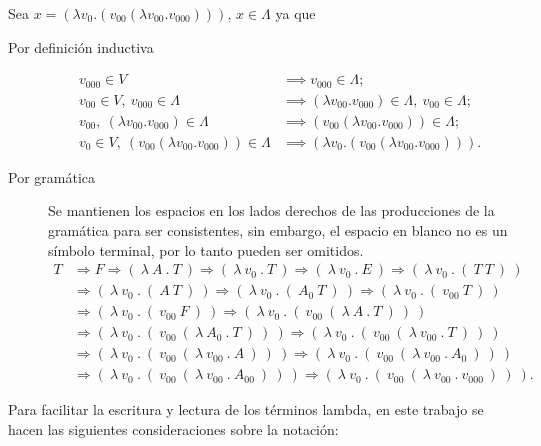 \begin{exmp} Sea \( x = (λv_{0}.(v_{00} (λv_{00}.v_{000}))) \), \( x \in Λ \) ya que

  \begin{description}
  \item[Por definición inductiva]
    \begin{align*}
      v_{000} \in V &\implies v_{000} \in Λ; \\
      v_{00} \in V,\ v_{000} \in Λ &\implies (λv_{00}.v_{000}) \in Λ,\ v_{00} \in Λ; \\
      v_{00},\ (λv_{00}.v_{000}) \in Λ &\implies (v_{00} (λv_{00}.v_{000})) \in Λ; \\
      v_{0} \in V,\ (v_{00} (λv_{00}.v_{000})) \in Λ &\implies (λv_{0}.(v_{00} (λv_{00}.v_{000}))).
    \end{align*}
  \item[Por gramática] Se mantienen los espacios en los lados derechos de las producciones de la gramática para ser consistentes, sin embargo, el espacio en blanco no es un símbolo terminal, por lo tanto pueden ser omitidos.
    \begin{align*}
      T &\Rightarrow F \Rightarrow (\ λ\ A\ .\ T\ ) \Rightarrow (\ λ\ v_{0}\ .\ T\ ) \Rightarrow (\ λ\ v_{0}\ .\ E\ ) \Rightarrow (\ λ\ v_{0}\ .\ (\ T\ T\ )\ ) \\
        &\Rightarrow (\ λ\ v_{0}\ .\ (\ A\ T\ )\ ) \Rightarrow (\ λ\ v_{0}\ .\ (\ A_{0}\ T\ )\ ) \Rightarrow (\ λ\ v_{0}\ .\ (\ v_{00}\ T\ )\ ) \\
        &\Rightarrow (\ λ\ v_{0}\ .\ (\ v_{00}\ F\ )\ ) \Rightarrow (\ λ\ v_{0}\ .\ (\ v_{00}\ (\ λ\ A\ .\ T\ )\ )\ ) \\
        &\Rightarrow (\ λ\ v_{0}\ .\ (\ v_{00}\ (\ λ\ A_{0}\ .\ T\ )\ )\ ) \Rightarrow (\ λ\ v_{0}\ .\ (\ v_{00}\ (\ λ\ v_{00}\ .\ T\ )\ )\ ) \\
        &\Rightarrow (\ λ\ v_{0}\ .\ (\ v_{00}\ (\ λ\ v_{00}\ .\ A\ )\ )\ ) \Rightarrow (\ λ\ v_{0}\ .\ (\ v_{00}\ (\ λ\ v_{00}\ .\ A_{0}\ )\ )\ ) \\
        &\Rightarrow (\ λ\ v_{0}\ .\ (\ v_{00}\ (\ λ\ v_{00}\ .\ A_{00}\ )\ )\ ) \Rightarrow (\ λ\ v_{0}\ .\ (\ v_{00}\ (\ λ\ v_{00}\ .\ v_{000}\ )\ )\ ).
    \end{align*}
  \end{description}
\end{exmp}

Para facilitar la escritura y lectura de los términos lambda, en este trabajo se hacen las siguientes consideraciones sobre la notación:

